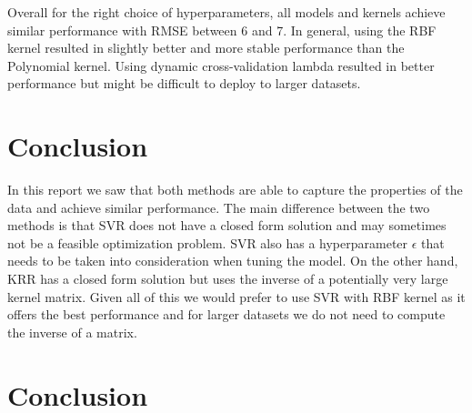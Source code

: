 \documentclass[9pt]{IEEEtran}
\begin{document}
Overall for the right choice of hyperparameters, all models and kernels achieve similar performance with RMSE between 6 and 7.
In general, using the RBF kernel resulted in slightly better and more stable performance than the Polynomial kernel.
Using dynamic cross-validation lambda resulted in better performance but might be difficult to deploy to larger datasets.



\section{Conclusion}

In this report we saw that both methods are able to capture the properties of the data and achieve similar performance.
The main difference between the two methods is that SVR does not have a closed form solution and may sometimes not be a feasible optimization problem.
SVR also has a hyperparameter $\epsilon$ that needs to be taken into consideration when tuning the model.
On the other hand, KRR has a closed form solution but uses the inverse of a potentially very large kernel matrix.
Given all of this we would prefer to use SVR with RBF kernel as it offers the best performance and for larger datasets we do not need to compute the inverse of a matrix.

\section*{Conclusion}




\end{document}
